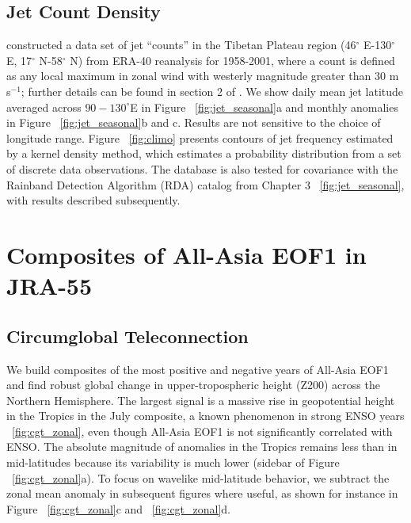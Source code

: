 \subsection{Jet Count Density} 

	\citet{Schiemann2009} constructed a data set of jet ``counts'' in the Tibetan Plateau region (46$^{\circ}$ E-130$^{\circ}$ E, 17$^{\circ}$ N-58$^{\circ}$ N) from ERA-40 reanalysis for 1958-2001, where a count is defined as any local maximum in zonal wind with westerly magnitude greater than $30$ m s$^{-1}$; further details can be found in section 2 of \citet{Schiemann2009}. We show daily mean jet latitude averaged across $90-130^\circ$E in Figure ~\ref{fig:jet_seasonal}a and monthly anomalies in Figure ~\ref{fig:jet_seasonal}b and c. Results are not sensitive to the choice of longitude range. Figure ~\ref{fig:climo} presents contours of jet frequency estimated by a kernel density method, which estimates a probability distribution from a set of discrete data observations. The \citet{Schiemann2009} database is also tested for covariance with the Rainband Detection Algorithm (RDA) catalog from Chapter 3 ~\ref{fig:jet_seasonal}, with results described subsequently.
	
\section{Composites of All-Asia EOF1 in JRA-55}

\subsection{Circumglobal Teleconnection}

	We build composites of the most positive and negative years of All-Asia EOF1 and find robust global change in upper-tropospheric height (Z200) across the Northern Hemisphere. The largest signal is a massive rise in geopotential height in the Tropics in the July composite, a known phenomenon in strong ENSO years ~\ref{fig:cgt_zonal}, even though All-Asia EOF1 is not significantly correlated with ENSO. The absolute magnitude of anomalies in the Tropics remains less than in mid-latitudes because its variability is much lower (sidebar of Figure ~\ref{fig:cgt_zonal}a). To focus on wavelike mid-latitude behavior, we subtract the zonal mean anomaly in subsequent figures where useful, as shown for instance in Figure ~\ref{fig:cgt_zonal}c and ~\ref{fig:cgt_zonal}d.
	
